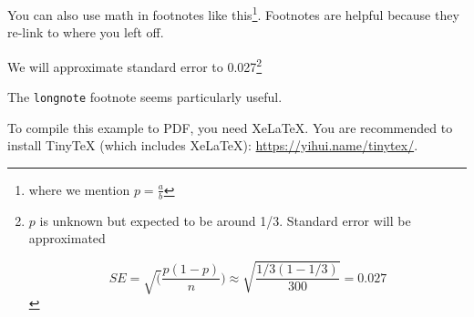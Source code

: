 \documentclass[
]{book}
\begin{document}
You can also use math in footnotes like this\footnote{where we mention \(p = \frac{a}{b}\)}. Footnotes are helpful because they re-link to where you left off.

We will approximate standard error to 0.027\footnote{\(p\) is unknown but expected to be around 1/3. Standard error will be approximated

  \[
  SE = \sqrt(\frac{p(1-p)}{n}) \approx \sqrt{\frac{1/3 (1 - 1/3)} {300}} = 0.027
  \]}

The \texttt{longnote} footnote seems particularly useful.

To compile this example to PDF, you need XeLaTeX. You are recommended to install TinyTeX (which includes XeLaTeX): \url{https://yihui.name/tinytex/}.

  
\end{document}
